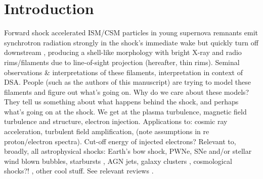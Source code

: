 \documentclass[iop, apj, numberedappendix, twocolappendix]{emulateapj}
\begin{document}

\section{Introduction}


Forward shock accelerated ISM/CSM particles in young supernova remnants emit
synchrotron radiation strongly in the shock's immediate wake but quickly turn
off downstream \citep{koyama1995, reynolds1996}, producing a shell-like
morphology with bright X-ray and radio rims/filaments due to line-of-sight
projection (hereafter, thin rims).
Seminal observations \& interpretations of these filaments, interpretation in
context of DSA.
People (such as the authors of this manuscript) are trying to model these
filaments and figure out what's going on.
Why do we care about these models?  They tell us something about what happens
behind the shock, and perhaps what's going on at the shock.  We get at the
plasma turbulence, magnetic field turbulence and structure, electron injection.
Applications to: cosmic ray acceleration, turbulent field amplification, (note
assumptions in re proton/electron spectra).  Cut-off energy of injected
electrons?  Relevant to, broadly, all astrophysical shocks: Earth's bow shock,
PWNe, SNe and/or stellar wind blown bubbles, starbursts \citep{heckman1990},
AGN jets, galaxy clusters \citep{van-weeren2010}, cosmological shocks?!
\citep{miniati2000, ryu2008}, other cool stuff.  See relevant reviews
\citep{blandford1987}.
\end{document}
